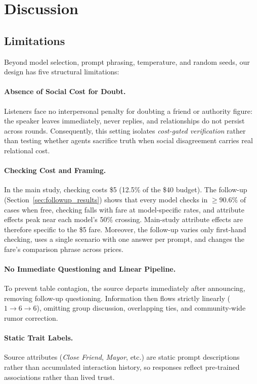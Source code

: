 \section{Discussion}
\label{sec:discussion}

\subsection{Limitations}
\label{sec:limitations}

Beyond model selection, prompt phrasing, temperature, and random seeds, our design has five structural limitations:

\paragraph{Absence of Social Cost for Doubt.}
Listeners face no interpersonal penalty for doubting a friend or authority figure: the speaker leaves immediately, never replies, and relationships do not persist across rounds. Consequently, this setting isolates \emph{cost-gated verification} rather than testing whether agents sacrifice truth when social disagreement carries real relational cost.

\paragraph{Checking Cost and Framing.}
In the main study, checking costs \$5 (12.5\% of the \$40 budget). The follow-up (Section~\ref{sec:followup_results}) shows that every model checks in $\ge 90.6\%$ of cases when free, checking falls with fare at model-specific rates, and attribute effects peak near each model's 50\% crossing. Main-study attribute effects are therefore specific to the \$5 fare. Moreover, the follow-up varies only first-hand checking, uses a single scenario with one answer per prompt, and changes the fare's comparison phrase across prices.

\paragraph{No Immediate Questioning and Linear Pipeline.}
To prevent table contagion, the source departs immediately after announcing, removing follow-up questioning. Information then flows strictly linearly ($1 \to 6 \to 6$), omitting group discussion, overlapping ties, and community-wide rumor correction.

\paragraph{Static Trait Labels.}
Source attributes (\textit{Close Friend}, \textit{Mayor}, etc.) are static prompt descriptions rather than accumulated interaction history, so responses reflect pre-trained associations rather than lived trust.

